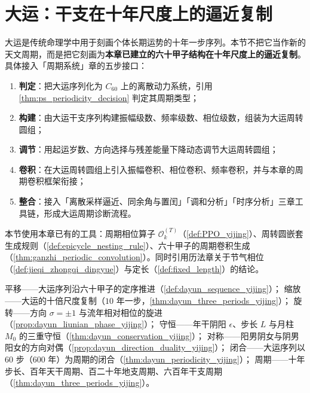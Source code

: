 \section{大运：干支在十年尺度上的逼近复制}
\label{sec:dayun_yijing}

\begin{remark}\label{rem:dayun_positioning_yijing}
大运是传统命理学中用于刻画个体长期运势的十年一步序列。本节不把它当作新的天文周期，而是把它刻画为\textbf{本章已建立的六十甲子结构在十年尺度上的逼近复制}。具体接入「周期系统」章的五步接口：
\begin{enumerate}[label=(\arabic*)]
    \item \textbf{判定}：把大运序列化为 $C_{60}$ 上的离散动力系统，引用 \cref{thm:ps_periodicity_decision} 判定其周期类型；
    \item \textbf{构建}：由大运干支序列构建振幅级数、频率级数、相位级数，组装为大运周转圆组；
    \item \textbf{调节}：用起运岁数、方向选择与残差能量下降动态调节大运周转圆组；
    \item \textbf{卷积}：在大运周转圆组上引入振幅卷积、相位卷积、频率卷积，并与本章的周期卷积框架衔接；
    \item \textbf{整合}：接入「离散采样逼近、同余角与置闰」「调和分析」「时序分析」三章工具链，形成大运周期诊断流程。
\end{enumerate}
本节使用本章已有的工具：周期相位算子 $\mathcal O_k^{(T)}$（\cref{def:PPO_yijing}）、周转圆嵌套生成规则（\cref{def:epicycle_nesting_rule}）、六十甲子的周期卷积生成（\cref{thm:ganzhi_periodic_convolution}）。同时引用历法章关于节气相位（\cref{def:jieqi_zhongqi_dingyue}）与定长（\cref{def:fixed_length}）的结论。
\end{remark}

\begin{remark}[本节七主题导引]\label{rem:dayun_seven_themes}
平移——大运序列沿六十甲子的定序推进（\cref{def:dayun_sequence_yijing}）；
缩放——大运的十倍尺度复制（$10$ 年一步，\cref{thm:dayun_three_periods_yijing}）；
旋转——方向 $\sigma=\pm 1$ 与流年相对相位的旋进（\cref{prop:dayun_liunian_phase_yijing}）；
守恒——年干阴阳 $\epsilon$、步长 $L$ 与月柱 $M_0$ 的三重守恒（\cref{thm:dayun_conservation_yijing}）；
对称——阳男阴女与阴男阳女的方向对偶（\cref{prop:dayun_direction_duality_yijing}）；
闭合——大运序列以 $60$ 步（$600$ 年）为周期的闭合（\cref{thm:dayun_periodicity_yijing}）；
周期——十年步长、百年天干周期、百二十年地支周期、六百年干支周期（\cref{thm:dayun_three_periods_yijing}）。
\end{remark}

